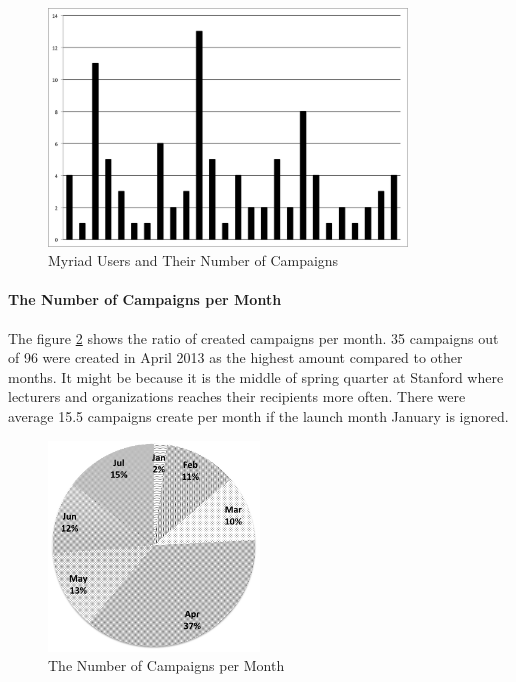 \begin{figure}[htbp]
	\centering
	\includegraphics[width=0.85\textwidth]{imgs/ChartUsersCampaigns.png}
	\caption[Myriad Users and Their Number of Campaigns]{Myriad Users and Their Number of Campaigns}
	\label{fig:ChartUsersCampaigns}
\end{figure}

\clearpage

\paragraph{The Number of Campaigns per Month} The figure \ref{fig:ChartCampaignsMonths} shows the ratio of created campaigns per month. 35 campaigns out of 96 were created in April 2013 as the highest amount compared to other months. It might be because it is the middle of spring quarter at Stanford where lecturers and organizations reaches their recipients more often. There were average 15.5 campaigns create per month if the launch month January is ignored.

\begin{figure}[htbp]
	\centering
	\includegraphics[width=0.50\textwidth]{imgs/ChartCampaignsMonths.png}
	\caption[The Number of Campaigns per Month]{The Number of Campaigns per Month}
	\label{fig:ChartCampaignsMonths}
\end{figure}

